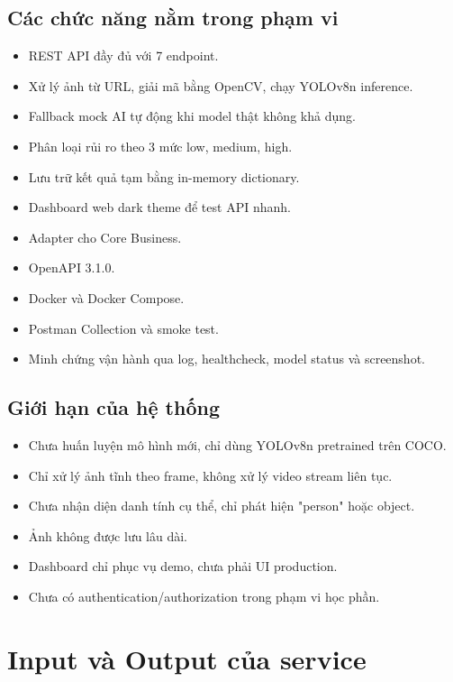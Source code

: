\subsection{Các chức năng nằm trong phạm vi}

\begin{itemize}
    \item REST API đầy đủ với 7 endpoint.
    \item Xử lý ảnh từ URL, giải mã bằng OpenCV, chạy YOLOv8n inference.
    \item Fallback mock AI tự động khi model thật không khả dụng.
    \item Phân loại rủi ro theo 3 mức low, medium, high.
    \item Lưu trữ kết quả tạm bằng in-memory dictionary.
    \item Dashboard web dark theme để test API nhanh.
    \item Adapter cho Core Business.
    \item OpenAPI 3.1.0.
    \item Docker và Docker Compose.
    \item Postman Collection và smoke test.
    \item Minh chứng vận hành qua log, healthcheck, model status và screenshot.
\end{itemize}

\subsection{Giới hạn của hệ thống}

\begin{itemize}
    \item Chưa huấn luyện mô hình mới, chỉ dùng YOLOv8n pretrained trên COCO.
    \item Chỉ xử lý ảnh tĩnh theo frame, không xử lý video stream liên tục.
    \item Chưa nhận diện danh tính cụ thể, chỉ phát hiện "person" hoặc object.
    \item Ảnh không được lưu lâu dài.
    \item Dashboard chỉ phục vụ demo, chưa phải UI production.
    \item Chưa có authentication/authorization trong phạm vi học phần.
\end{itemize}

\section{Input và Output của service}

